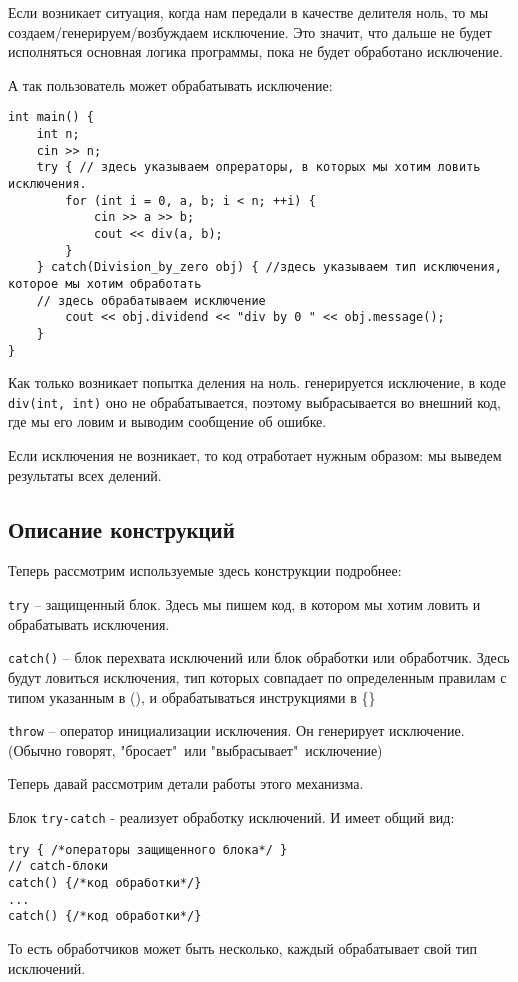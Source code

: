 Если возникает ситуация, когда нам передали в качестве делителя ноль, то мы создаем/генерируем/возбуждаем исключение. Это значит, что дальше не будет исполняться основная логика программы, пока не будет обработано исключение.

А так пользователь может обрабатывать исключение:
\begin{verbatim}
int main() {
    int n;
    cin >> n;
    try { // здесь указываем опрераторы, в которых мы хотим ловить исключения.
        for (int i = 0, a, b; i < n; ++i) {
            cin >> a >> b;
            cout << div(a, b);
        }
    } catch(Division_by_zero obj) { //здесь указываем тип исключения, которое мы хотим обработать
    // здесь обрабатываем исключение
        cout << obj.dividend << "div by 0 " << obj.message();
    }
}
\end{verbatim}

Как только возникает попытка деления на ноль. генерируется исключение, в коде \texttt{div(int, int)} оно не обрабатывается, поэтому выбрасывается во внешний код, где мы его ловим и выводим сообщение об ошибке.

Если исключения не возникает, то код отработает нужным образом: мы выведем результаты всех делений.

\subsection{Описание конструкций}
Теперь рассмотрим используемые здесь конструкции подробнее:

\texttt{try{}} -- защищенный блок. Здесь мы пишем код, в котором мы хотим ловить и обрабатывать исключения.

\texttt{catch(){}} -- блок перехвата исключений или блок обработки или обработчик. Здесь будут ловиться исключения, тип которых совпадает по определенным правилам с типом указанным в (), и обрабатываться инструкциями в \{\}

\texttt{throw} -- оператор инициализации исключения. Он генерирует исключение. (Обычно говорят, "бросает"\ или "выбрасывает"\ исключение)

Теперь давай рассмотрим детали работы этого механизма.

Блок \texttt{try-catch} - реализует обработку исключений. И имеет общий вид:
\begin{verbatim}
try { /*операторы защищенного блока*/ }
// catch-блоки
catch() {/*код обработки*/}
...
catch() {/*код обработки*/}

\end{verbatim}
То есть обработчиков может быть несколько, каждый обрабатывает свой тип исключений.

